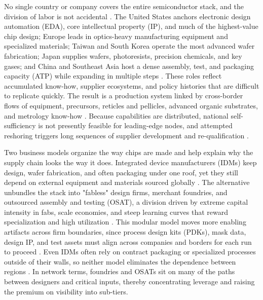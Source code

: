 No single country or company covers the entire semiconductor stack, and the division of labor is not accidental \parencite{palma_growing_2022}. The United States anchors electronic design automation (EDA), core intellectual property (IP), and much of the highest-value chip design; Europe leads in optics-heavy manufacturing equipment and specialized materials; Taiwan and South Korea operate the most advanced wafer fabrication; Japan supplies wafers, photoresists, precision chemicals, and key gases; and China and Southeast Asia host a dense assembly, test, and packaging capacity (ATP) while expanding in multiple steps \parencite{semiconductor_industry_association_2025_2025, kim_potential_2019}. These roles reflect accumulated know-how, supplier ecosystems, and policy histories that are difficult to replicate quickly. The result is a production system linked by cross-border flows of equipment, precursors, reticles and pellicles, advanced organic substrates, and metrology know-how \parencite{thadani_mapping_2023}. Because capabilities are distributed, national self-sufficiency is not presently feasible for leading-edge nodes, and attempted reshoring triggers long sequences of supplier development and re-qualification \parencite{palma_growing_2022}.

Two business models organize the way chips are made and help explain why the supply chain looks the way it does. Integrated device manufacturers (IDMs) keep design, wafer fabrication, and often packaging under one roof, yet they still depend on external equipment and materials sourced globally \parencite{oecd_measuring_2019}. The alternative unbundles the stack into "fabless" design firms, merchant foundries, and outsourced assembly and testing (OSAT), a division driven by extreme capital intensity in fabs, scale economies, and steep learning curves that reward specialization and high utilization \parencite{sturgeon_global_2010,oecd_measuring_2019}. This modular model moves more enabling artifacts across firm boundaries, since process design kits (PDKs), mask data, design IP, and test assets must align across companies and borders for each run to proceed \parencite{palma_growing_2022}. Even IDMs often rely on contract packaging or specialized processes outside of their walls, so neither model eliminates the dependence between regions \parencite{khan_semiconductor_2021}. In network terms, foundries and OSATs sit on many of the paths between designers and critical inputs, thereby concentrating leverage and raising the premium on visibility into sub-tiers.

